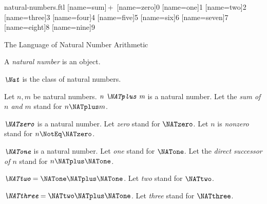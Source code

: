 \documentclass{stex}
\begin{document}
\begin{smodule}{natural-numbers.ftl}
[name=sum]{\,+\,}
[name=zero]{0}
[name=one]{1}
[name=two]{2}
[name=three]{3}
[name=four]{4}
[name=five]{5}
[name=six]{6}
[name=seven]{7}
[name=eight]{8}
[name=nine]{9}

\begin{sfragment}{The Language of Natural Number Arithmetic}
  \begin{signature}[forthel,for=natural number]
    A \emph{natural number} is an object.
  \end{signature}

  \begin{definition}[forthel,for=Nat]
    $\emph{\Nat}$ is the class of natural numbers.
  \end{definition}

  \begin{signature}[forthel,for=sum]
    Let $n, m$ be natural numbers.
    $\emph{n \NATplus m}$ is a natural number.
    Let the \emph{sum of $n$ and $m$} stand for $n \NATplus m$.
  \end{signature}

  \begin{signature}[forthel,for={zero,nonzero}]
    $\emph{\NATzero}$ is a natural number.
    Let \emph{zero} stand for $\NATzero$.
    Let $n$ is \emph{nonzero} stand for $n \NotEq \NATzero$.
  \end{signature}

  \begin{signature}[forthel,for={one,direct successor}]
    $\emph{\NATone}$ is a natural number.
    Let \emph{one} stand for $\NATone$.
    Let the \emph{direct successor of $n$} stand for $n \NATplus \NATone$.
  \end{signature}

  \begin{definition}[forthel,for=two]
    $\emph{\NATtwo} = \NATone \NATplus \NATone$.
    Let \emph{two} stand for $\NATtwo$.
  \end{definition}

  \begin{definition}[forthel,for=three]
    $\emph{\NATthree} = \NATtwo \NATplus \NATone$.
    Let \emph{three} stand for $\NATthree$.
  \end{definition}


\end{sfragment}
\end{smodule}
\end{document}
